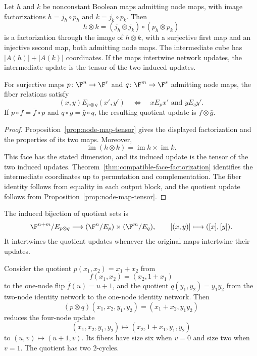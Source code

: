 \begin{theorem}\label{thm:tensor-face-factorization}
Let $h$ and $k$ be nonconstant Boolean maps admitting node maps, with image factorizations $h=j_h\circ p_h$ and $k=j_k\circ p_k$. Then
\[
    h\otimes k=(j_h\otimes j_k)\circ(p_h\otimes p_k)
\]
is a factorization through the image of $h\otimes k$, with a surjective first map and an injective second map, both admitting node maps. The intermediate cube has $|A(h)|+|A(k)|$ coordinates. If the maps intertwine network updates, the intermediate update is the tensor of the two induced updates.

For surjective maps $p\colon\F^n\to\F^r$ and $q\colon\F^m\to\F^s$ admitting node maps, the fiber relations satisfy
\[
    (x,y)\mathrel{E_{p\otimes q}}(x',y')
    \quad\Longleftrightarrow\quad
    x\mathrel{E_p}x'\text{ and }y\mathrel{E_q}y'.
\]
If $p\circ f=\bar f\circ p$ and $q\circ g=\bar g\circ q$, the resulting quotient update is $\bar f\otimes\bar g$.
\end{theorem}

\begin{proof}
Proposition~\ref{prop:node-map-tensor} gives the displayed factorization and the properties of its two maps. Moreover,
\[
    \operatorname{im}(h\otimes k)
    =\operatorname{im}h\times\operatorname{im}k.
\]
This face has the stated dimension, and its induced update is the tensor of the two induced updates. Theorem~\ref{thm:compatible-face-factorization} identifies the intermediate coordinates up to permutation and complementation. The fiber identity follows from equality in each output block, and the quotient update follows from Proposition~\ref{prop:node-map-tensor}.
\end{proof}

The induced bijection of quotient sets is
\[
    \F^{n+m}/E_{p\otimes q}
    \longrightarrow(\F^n/E_p)\times(\F^m/E_q),
    \qquad [(x,y)]\longmapsto([x],[y]).
\]
It intertwines the quotient updates whenever the original maps intertwine their updates.

\begin{example}\label{ex:tensor-independent-quotients}
Consider the quotient $p(x_1,x_2)=x_1+x_2$ from
\[
    f(x_1,x_2)=(x_2,1+x_1)
\]
to the one-node flip $\bar f(u)=u+1$, and the quotient $q(y_1,y_2)=y_1y_2$ from the two-node identity network to the one-node identity network. Then
\[
    (p\otimes q)(x_1,x_2,y_1,y_2)
    =(x_1+x_2,y_1y_2)
\]
reduces the four-node update
\[
    (x_1,x_2,y_1,y_2)\longmapsto(x_2,1+x_1,y_1,y_2)
\]
to $(u,v)\mapsto(u+1,v)$. Its fibers have size six when $v=0$ and size two when $v=1$. The quotient has two $2$-cycles.
\end{example}

